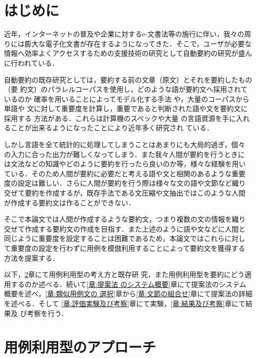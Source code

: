 \documentclass[japanese]{jnlp_1.4}
\begin{document}
\maketitle


\section{はじめに}\label{節:背景}

近年，インターネットの普及や企業に対するe-文書法等の施行に伴い，我々の周
りには膨大な電子化文書が存在するようになってきた．そこで，ユーザが必要な
情報へ効率よくアクセスするための支援技術の研究として自動要約の研究が盛ん
に行われている．

自動要約の既存研究としては，要約する前の文章（原文）とそれを要約したもの（要
約文）のパラレルコーパスを使用し，どのような語が要約文へ採用されているのか
確率を用いることによってモデル化する手法 
\cite{Jing:2000,Daume:2002,Vandeghinste:2004}や，大量のコーパスから単語や
文に対して重要度を計算し，重要であると判断された語や文を要約文に採用する
方法がある．これらは計算機のスペックや大量
の言語資源を手に入れることが出来るようになったことにより近年多く研究され
ている．


しかし言語を全て統計的に処理してしまうことはあまりにも大局的過ぎ，個々
の入力に合った出力が難しくなってしまう．また我々人間が要約を行うときに
は文法などの知識やどのように要約を行ったら良いのか等，様々な経験を用い
ている．そのため人間が要約に必要だと考える語や文と相関のあるような重要
度の設定は難しい．さらに人間が要約を行う際は様々な文の語や文節など織り
交ぜて要約を作成するが，既存手法である文圧縮や文抽出ではこのような人間
が作成する要約文は作ることができない．

そこで本論文では人間が作成するような要約文，つまり複数の文の情報を織り
交ぜて作成する要約文の作成を目指す．また上述のように語や文などに人間と
同じように重要度を設定することは困難であるため，本論文ではこれらに対し
て重要度の設定を行わずに用例を模倣利用することによって要約文を獲得する
方法を提案する．


以下，\ref{章:用例利用型のアプローチ}章にて用例利用型の考え方と既存研
究，また用例利用型を要約にどう適用するのか述べる．続いて\ref{章:提案法
のシステム概要}章にて提案法のシステム概要を述べ，\ref{章:類似用例文の
選択}章から\ref{章:文節の組合せ}章にて提案法の詳細を述べる．そして
\ref{章:評価実験及び考察}章にて実験，\ref{章:結果及び考察}章にて結果及
び考察を行う．




\section{用例利用型のアプローチ}\label{章:用例利用型のアプローチ}
\end{document}
